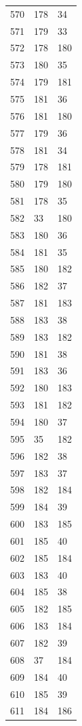 \documentclass[a4paper,11pt]{article}
\begin{document}
\begin{center}
\begin{longtable}{|R{1.5cm}|R{1.5cm}|R{1.5cm}|}
  570 &  178 &   34 \\
  571 &  179 &   33 \\
  572 &  178 &  180 \\
  573 &  180 &   35 \\
  574 &  179 &  181 \\
  575 &  181 &   36 \\
  576 &  181 &  180 \\
  577 &  179 &   36 \\
  578 &  181 &   34 \\
  579 &  178 &  181 \\
  580 &  179 &  180 \\
  581 &  178 &   35 \\
  582 &   33 &  180 \\
  583 &  180 &   36 \\
  584 &  181 &   35 \\
  585 &  180 &  182 \\
  586 &  182 &   37 \\
  587 &  181 &  183 \\
  588 &  183 &   38 \\
  589 &  183 &  182 \\
  590 &  181 &   38 \\
  591 &  183 &   36 \\
  592 &  180 &  183 \\
  593 &  181 &  182 \\
  594 &  180 &   37 \\
  595 &   35 &  182 \\
  596 &  182 &   38 \\
  597 &  183 &   37 \\
  598 &  182 &  184 \\
  599 &  184 &   39 \\
  600 &  183 &  185 \\
  601 &  185 &   40 \\
  602 &  185 &  184 \\
  603 &  183 &   40 \\
  604 &  185 &   38 \\
  605 &  182 &  185 \\
  606 &  183 &  184 \\
  607 &  182 &   39 \\
  608 &   37 &  184 \\
  609 &  184 &   40 \\
  610 &  185 &   39 \\
  611 &  184 &  186 \\

\end{longtable}
\end{center}
\end{document}
